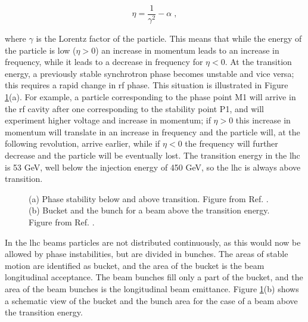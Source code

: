 \begin{equation}
\eta = \frac{1}{\gamma^2} - \alpha \; ,
\end{equation}

\noindent where $\gamma$ is the Lorentz factor of the particle. This means that while the energy of the particle is low ($\eta>0$) an increase in momentum leads to an increase in frequency, while it leads to a decrease in frequency for $\eta<0$. At the transition energy, a previously stable synchrotron phase becomes unstable and vice versa; this requires a rapid change in \gls{rf} phase. This situation is illustrated in Figure \ref{fig:lhc:phase}(a). For example, a particle corresponding to the phase point M1 will arrive in the \gls{rf} cavity after one corresponding to the stability point P1, and will experiment higher voltage and increase in momentum; if $\eta>0$ this increase in momentum will translate in an increase in frequency and the particle will, at the following revolution, arrive earlier, while if $\eta<0$ the frequency will further decrease and the particle will be eventually lost.  The transition energy in the \gls{lhc} is 53 GeV, well below the injection energy of 450 GeV, so the \gls{lhc} is always above transition. 

\begin{figure}[ht]
\centering
{}
\caption{(a) Phase stability below and above transition. Figure from Ref. \cite{Tecker:2016mlq}. (b) Bucket and the bunch for a beam above the transition energy. Figure from Ref. \cite{Baird:1017689}.}
\label{fig:lhc:phase}
\end{figure}


In the \gls{lhc} beams particles are not distributed continuously, as this would now be allowed by phase instabilities, but are divided in bunches. 
The areas of stable motion are identified as bucket, and the area of the bucket is the beam longitudinal acceptance. 
The beam bunches fill only a part of the bucket, and the area of the beam bunches is the longitudinal beam emittance. Figure \ref{fig:lhc:phase}(b) shows a schematic view of the bucket and the bunch area for the case of a beam above the transition energy. 

